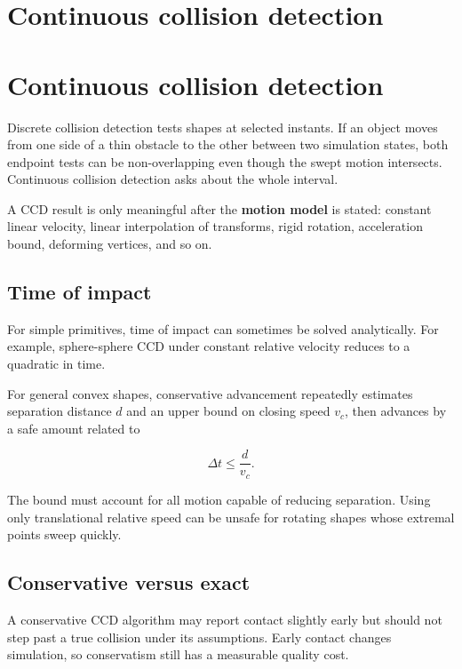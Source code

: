 \hypertarget{appendix-66956ed6c753}{}
\section*{Continuous collision detection}
\section{Continuous collision detection}\label{continuous-collision-detection}

Discrete collision detection tests shapes at selected instants. If an object moves from one side of a thin obstacle to the other between two simulation states, both endpoint tests can be non-overlapping even though the swept motion intersects. Continuous collision detection asks about the whole interval.

A CCD result is only meaningful after the \textbf{motion model} is stated: constant linear velocity, linear interpolation of transforms, rigid rotation, acceleration bound, deforming vertices, and so on.

\subsection{Time of impact}\label{time-of-impact}

For simple primitives, time of impact can sometimes be solved analytically. For example, sphere-sphere CCD under constant relative velocity reduces to a quadratic in time.

For general convex shapes, conservative advancement repeatedly estimates separation distance \(d\) and an upper bound on closing speed \(v_c\), then advances by a safe amount related to

\[
\Delta t\le \frac{d}{v_c}.
\]

The bound must account for all motion capable of reducing separation. Using only translational relative speed can be unsafe for rotating shapes whose extremal points sweep quickly.

\subsection{Conservative versus exact}\label{conservative-versus-exact}

A conservative CCD algorithm may report contact slightly early but should not step past a true collision under its assumptions. Early contact changes simulation, so conservatism still has a measurable quality cost.

